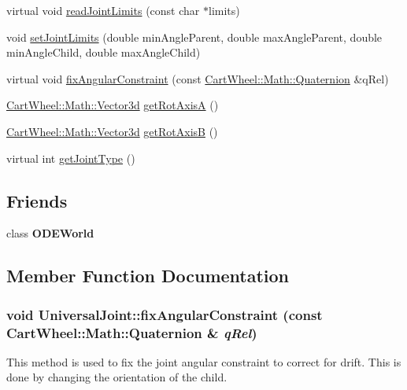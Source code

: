 \begin{DoxyCompactItemize}
\item 
virtual void \hyperlink{classCartWheel_1_1Physics_1_1UniversalJoint_a2b5b26135ffc93f34b26e1b0c35e7405}{readJointLimits} (const char $\ast$limits)
\item 
void \hyperlink{classCartWheel_1_1Physics_1_1UniversalJoint_a2df8451e6bb9357d98ace6cf7df10b6f}{setJointLimits} (double minAngleParent, double maxAngleParent, double minAngleChild, double maxAngleChild)
\item 
virtual void \hyperlink{classCartWheel_1_1Physics_1_1UniversalJoint_aa412e188e11d12d1a45dc28fcc317b3e}{fixAngularConstraint} (const \hyperlink{classCartWheel_1_1Math_1_1Quaternion}{CartWheel::Math::Quaternion} \&qRel)
\item 
\hyperlink{classCartWheel_1_1Math_1_1Vector3d}{CartWheel::Math::Vector3d} \hyperlink{classCartWheel_1_1Physics_1_1UniversalJoint_ae0c9e3dfd1c9fcf90b580578a2160fe6}{getRotAxisA} ()
\item 
\hyperlink{classCartWheel_1_1Math_1_1Vector3d}{CartWheel::Math::Vector3d} \hyperlink{classCartWheel_1_1Physics_1_1UniversalJoint_a867466f51e95e0b4c32fd35eb8e2b338}{getRotAxisB} ()
\item 
virtual int \hyperlink{classCartWheel_1_1Physics_1_1UniversalJoint_afd2448f6efafb3e09049209e56c55996}{getJointType} ()
\end{DoxyCompactItemize}
\subsection*{Friends}
\begin{DoxyCompactItemize}
\item 
\hypertarget{classCartWheel_1_1Physics_1_1UniversalJoint_a5db30e1aef955cb40c04658eacff8680}{
class {\bfseries ODEWorld}}
\label{classCartWheel_1_1Physics_1_1UniversalJoint_a5db30e1aef955cb40c04658eacff8680}

\end{DoxyCompactItemize}


\subsection{Member Function Documentation}
\hypertarget{classCartWheel_1_1Physics_1_1UniversalJoint_aa412e188e11d12d1a45dc28fcc317b3e}{
\subsubsection[{fixAngularConstraint}]{\setlength{\rightskip}{0pt plus 5cm}void UniversalJoint::fixAngularConstraint (const {\bf CartWheel::Math::Quaternion} \& {\em qRel})}}
\label{classCartWheel_1_1Physics_1_1UniversalJoint_aa412e188e11d12d1a45dc28fcc317b3e}
This method is used to fix the joint angular constraint to correct for drift. This is done by changing the orientation of the child. 

